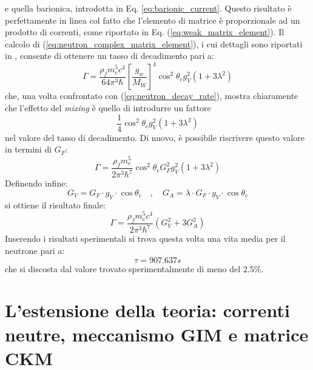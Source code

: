 \documentclass{subnucbo}
\begin{document}
e quella barionica, introdotta in Eq. \ref{eq:barionic_current}. Questo risultato è perfettamente in linea col fatto che l'elemento di matrice è proporzionale ad un prodotto di correnti, come riportato in Eq. (\ref{eq:weak_matrix_element}).
Il calcolo di (\ref{eq:neutron_complex_matrix_element}), i cui dettagli sono riportati in \cite{ref:hayes}, consente di ottenere un tasso di decadimento pari a:
\begin{equation}
        \Gamma = \frac { \rho_{f} m _ { e } ^ { 5 } c ^ { 4 } } { 64 \pi ^ { 3 } \hbar } \left[ \frac { g _ { w } } { M _ { W } } \right] ^ { 4 } \cos^{2}\theta_{c} g _ { V } ^ { 2 } \left( 1 + 3 \lambda ^ { 2 } \right)
\end{equation}
che, una volta confrontato con (\ref{eq:neutron_decay_rate}), mostra chiaramente che l'effetto del \textit{mixing} è quello di introdurre un fattore
\begin{equation}
        \frac { 1 } { 4 } \cos^{2}\theta_{c} g _ { V } ^ { 2 } \left( 1 + 3 \lambda ^ { 2 } \right)
\end{equation}
nel valore del tasso di decadimento. Di nuovo, è possibile riscrivere questo valore in termini di $G_{F}$:
\begin{equation}
        \Gamma = \frac { \rho_{f} m _ { e } ^ { 5 } } { 2 \pi ^ { 3 } \hbar ^ { 7 } } \cos^{2}\theta_{c} G _ { F } ^ { 2 }g_{V}^{2} \left( 1 + 3 \lambda ^ { 2 } \right)
\end{equation}
Definendo infine:
\begin{equation}
        G _ { V } = G _ { F }\cdot g_{V} \cdot \cos\theta_{c} \quad,\quad G _ { A } = \lambda \cdot G _ { F } \cdot g_{V} \cdot \cos\theta_{c}
\end{equation}
si ottiene il risultato finale:
\begin{equation}
        \Gamma = \frac { \rho_{f} m _ { e } ^ { 5 } c ^ { 4 } } { 2 \pi ^ { 3 } \hbar ^ { 7 } } \left( G _ { V } ^ { 2 } + 3 G _ { A } ^ { 2 } \right)
\end{equation}
Inserendo i risultati sperimentali si trova questa volta una vita media per il neutrone pari a:
\begin{equation}
        \tau = 907.637 s
\end{equation}
che si discosta dal valore trovato sperimentalmente di meno del $2.5\%$.

\section{L'estensione della teoria: correnti neutre, meccanismo GIM e matrice CKM}
\end{document}

